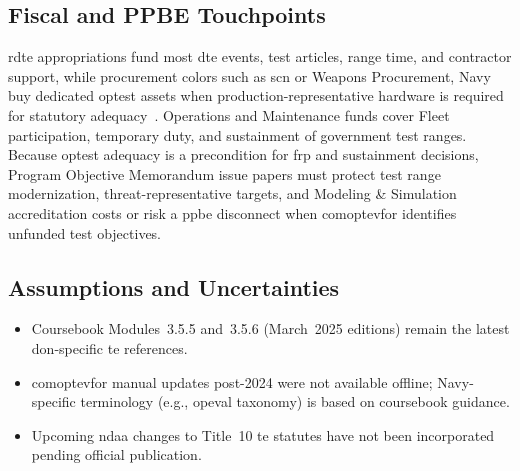 \documentclass[../main.tex]{subfiles}
\begin{document}
\subsection{Fiscal and PPBE Touchpoints}
\ac{rdte} appropriations fund most \ac{dte} events, test articles, range time, and contractor support, while procurement colors such as \ac{scn} or Weapons Procurement, Navy buy dedicated \ac{optest} assets when production-representative hardware is required for statutory adequacy~\autocite{DoDFMR-Vol3,edo-3-5-5-test-eval-part-i-2025}. Operations and Maintenance funds cover Fleet participation, temporary duty, and sustainment of government test ranges. Because \ac{optest} adequacy is a precondition for \ac{frp} and sustainment decisions, Program Objective Memorandum issue papers must protect test range modernization, threat-representative targets, and Modeling \& Simulation accreditation costs or risk a \ac{ppbe} disconnect when \ac{comoptevfor} identifies unfunded test objectives.

\subsection{Assumptions and Uncertainties}
\begin{itemize}
  \item Coursebook Modules~3.5.5 and~3.5.6 (March~2025 editions) remain the latest \ac{don}-specific \ac{te} references.
  \item \ac{comoptevfor} manual updates post-2024 were not available offline; Navy-specific terminology (e.g., \ac{opeval} taxonomy) is based on coursebook guidance.
  \item Upcoming \ac{ndaa} changes to Title~10 \ac{te} statutes have not been incorporated pending official publication.
\end{itemize}

\end{document}
